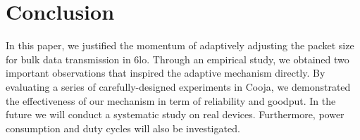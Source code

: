 \documentclass[runningheads,a4paper]{llncs}
\begin{document}
\section{Conclusion}
In this paper, we justified the momentum of adaptively adjusting the packet size for bulk data transmission in 6lo. Through an empirical study, we obtained two important observations that inspired the adaptive mechanism directly. By evaluating a series of carefully-designed experiments in Cooja, we demonstrated the effectiveness of our mechanism in term of reliability and goodput. In the future we will conduct a systematic study on real devices. Furthermore, power consumption and duty cycles will also be investigated.



\end{document}
